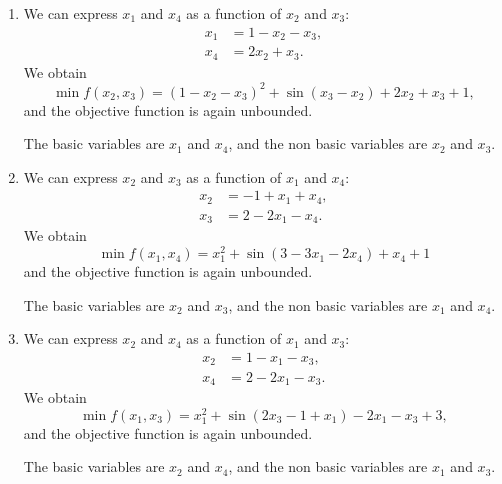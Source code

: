 \begin{enumerate}
\item We can express $x_1$ and $x_4$ as a function of $x_2$ and $x_3$:
  \begin{align*}
  x_1 & =1 -x_2-x_3, \\
  x_4 & = 2 x_2 + x_3.
  \end{align*}
  We obtain
  \[
  \min f(x_2,x_3)=(1 -x_2-x_3)^2+\sin(x_3-x_2)+2 x_2 + x_3+1,
  \]
and the objective function is again  unbounded.

The basic
variables are $x_1$ and $x_4$, and the non basic variables are $x_2$
and $x_3$.

\item We can express $x_2$ and $x_3$ as a function of $x_1$ and $x_4$:
  \begin{align*}
  x_2 & =-1 +x_1+x_4, \\
  x_3 & = 2 - 2x_1 - x_4.
  \end{align*}
  We obtain
  \[
  \min f(x_1,x_4)= x_1^2+\sin(3-3x_1 -2 x_4)+x_4+1
  \]
and the objective function is again  unbounded.

The basic
variables are $x_2$ and $x_3$, and the non basic variables are $x_1$
and $x_4$.

\item We can express $x_2$ and $x_4$ as a function of $x_1$ and $x_3$:
  \begin{align*}
  x_2 & =1 -x_1-x_3, \\
  x_4 & = 2 - 2x_1 - x_3.
  \end{align*}
  We obtain
  \[
  \min f(x_1,x_3)= x_1^2+\sin(2x_3-1+x_1)- 2x_1 - x_3+3,
  \]
and the objective function is again  unbounded.

The basic
variables are $x_2$ and $x_4$, and the non basic variables are $x_1$
and $x_3$.
\end{enumerate}
